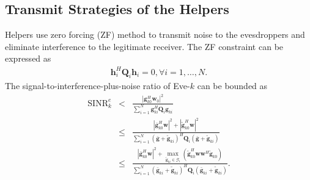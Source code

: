 \documentclass[journal]{IEEEtran}
\begin{document}

\subsection{Transmit Strategies of the Helpers}
Helpers use zero forcing (ZF) method to transmit noise to the evesdroppers and eliminate interference to the legitimate receiver.
The ZF constraint can be expressed as
\begin{eqnarray} \label{eq:ZF constraint}
\mathbf{h}_i^H\mathbf{Q}_i \mathbf{h}_i = 0, \forall i = 1,\ldots,N \label{eq:ZF_constraint_relaxed}.
\end{eqnarray}
The signal-to-interference-plus-noise ratio of Eve-$k$ can be bounded as
\begin{eqnarray}
\mathrm{SINR}_k^e & < & \frac{\left| \mathbf{g}_{k0}^H\mathbf{w}_{0}\right|^2}{\sum_{i=1}^{N}\mathbf{g}_{ki}^H\mathbf{Q}_{i}\mathbf{g}_{ki}} \label{eq:neglect_sigma}\\
&\leq & \frac{\left|\bar{\mathbf{g}}_{k0}^H\mathbf{w}\right|^2 + \left|\tilde{\mathbf{g}}_{k0}^H\mathbf{w}\right|^2}{\sum_{i = 1}^N(\bar{\mathbf{g}}+\tilde{\mathbf{g}}_{ki})^H\mathbf{Q}_i(\bar{\mathbf{g}}+\tilde{\mathbf{g}}_{ki})}\\
& \leq & \frac{\left|\bar{\mathbf{g}}_{k0}^H\mathbf{w}\right|^2 + \max_{\tilde{\mathbf{g}}_{ki} \in \mathcal{G}_i}(\tilde{\mathbf{g}}_{k0}^H\mathbf{w}\mathbf{w}^H\tilde{\mathbf{g}}_{k0})}{\sum_{i = 1}^N(\bar{\mathbf{g}}_{ki}+\tilde{\mathbf{g}}_{ki})^H\mathbf{Q}_i(\bar{\mathbf{g}}_{ki}+\tilde{\mathbf{g}}_{ki})} .
\label{eq:SINR_e}
\end{eqnarray}
\end{document}
